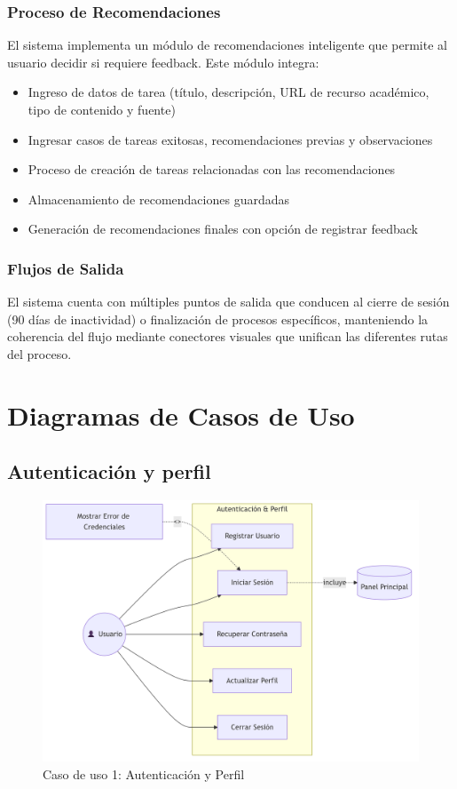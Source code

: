 \documentclass{pretexto/report}
\begin{document}
\subsubsection{Proceso de Recomendaciones}
El sistema implementa un módulo de recomendaciones inteligente que permite al usuario decidir si requiere feedback.
 Este módulo integra:
\begin{itemize}
\item Ingreso de datos de tarea (título, descripción, URL de recurso académico, tipo de contenido y fuente)
\item Ingresar casos de tareas exitosas, recomendaciones previas y observaciones
\item Proceso de creación de tareas relacionadas con las recomendaciones
\item Almacenamiento de recomendaciones guardadas
\item Generación de recomendaciones finales con opción de registrar feedback
\end{itemize}
\subsubsection{Flujos de Salida}
El sistema cuenta con múltiples puntos de salida que conducen al cierre de sesión (90 días de inactividad) 
o finalización de procesos específicos, manteniendo la coherencia del flujo mediante conectores visuales 
que unifican las diferentes rutas del proceso.

\section{Diagramas de Casos de Uso}
\subsection{Autenticación y perfil}
\begin{figure}[H]
    \centering
    \includegraphics[width=0.7\linewidth]{pngs/uc_1.png}
    \caption{Caso de uso 1: Autenticación y Perfil}
\end{figure}
\end{document}
